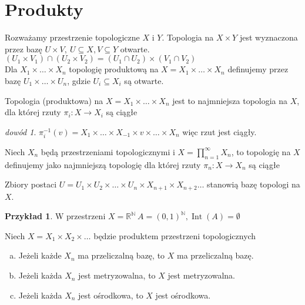 \documentclass[twoside,10pt]{article}
\theoremstyle{definition}
\theoremstyle{definition}
\theoremstyle{definition}
\theoremstyle{definition}
\theoremstyle{remark}
\newtheorem*{dd}{dowód}
\theoremstyle{definition}
\theoremstyle{definition}
\theoremstyle{definition}
\theoremstyle{definition}
\newtheorem*{prz}{Przykład}
\theoremstyle{definition}
\theoremstyle{definition}
\begin{document}
\section{Produkty} 
\begin{df} 
    Rozważamy przestrzenie topologiczne $X$ i $Y$. Topologia na $X \times Y$ jest 
    wyznaczona przez bazę $U \times V,\ U \subseteq X, V \subseteq Y$ otwarte. \\ 
    $(U_1 \times V_1) \cap (U_2 \times V_2) = (U_1 \cap U_2) \times (V_1 \cap V_2)$ \\
    Dla $X_1 \times \ldots \times X_n$ topologię produktową na 
    $X = X_1 \times \ldots \times X_n$ 
    definujemy przez bazę $U_1 \times \ldots \times U_n$, gdzie $U_i \subseteq X_i$ są 
    otwarte. 
\end{df} 
\begin{tw} 
    Topologia (produktowa) na $X = X_1 \times \ldots \times X_n$ jest to najmniejsza 
    topologia na $X$, dla której rzuty $\pi_i: X \to X_i$ są ciągłe 
\end{tw} 
\begin{dd} 
    $\pi_i^{-1} (v) = X_1 \times \ldots \times X_{-1} \times v \times \ldots \times X_n$ 
    więc rzut jest ciągły. 
\end{dd} 
\begin{df} 
    Niech $X_n$ będą przestrzeniami topologicznymi i $X = \prod\limits_{n=1}^\infty
    X_n$, to topologię na $X$ definujemy jako najmniejszą topologię dla której rzuty 
    $\pi_n : X \to X_n$ są ciągłe 
\end{df} 
\begin{tw} 
    Zbiory postaci $U = U_1 \times U_2 \times \ldots \times U_n \times X_{n+1} 
    \times X_{n+2} \ldots$
    stanowią bazę topologi na $X$.
\end{tw} 
\begin{prz} 
    W przestrzeni $X = \mathbb R ^{\mathbb N} \ A = (0,1)^{\mathbb N}, \operatorname{Int}
    (A) = \emptyset$
\end{prz} 
\begin{tw} 
    Niech $X = X_1 \times X_2 \times \ldots$ będzie produktem przestrzeni topologicznych 
    \begin{enumerate}[(a)] 
        \item Jeżeli każde $X_n$ ma przeliczalną bazę, to $X$ ma przeliczalną bazę. 
        \item Jeżeli każda $X_n$ jest metryzowalna, to $X$ jest metryzowalna. 
        \item Jeżeli każda $X_n$ jest ośrodkowa, to $X$ jest ośrodkowa. 
    \end{enumerate} 
\end{tw}
\end{document}
